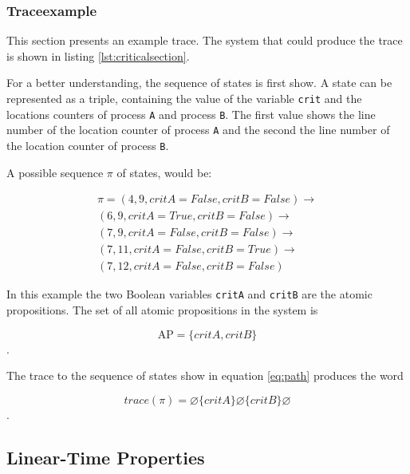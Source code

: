 \documentclass[12pt,a4paper,twoside]{article}
\begin{document}
\subsubsection{Traceexample}
\label{sec:traceexample}

This section presents an example trace. The system that could produce the trace is shown in listing \ref{lst:criticalsection}.



For a better understanding, the sequence of states is first show. A state can be represented as a triple, containing the value of the variable \verb|crit| and the locations counters of process \verb|A| and process \verb|B|. The first value shows the line number of the location counter of process \verb|A| and the second the line number of the location counter of process \verb|B|.

A possible sequence $\pi$ of states, would be:

\begin{equation}
  \label{eq:path}
  \begin{split}
\pi = (4, 9, {critA}={False},{critB}=False) \rightarrow \\
(6, 9, {critA}={True},{critB}=False) \rightarrow \\
(7, 9, {critA}={False},{critB}=False) \rightarrow \\
(7, 11, {critA}={False},{critB}=True) \rightarrow \\
(7, 12, {critA}={False},{critB}=False)
  \end{split}
\end{equation}

In this example the two Boolean variables \verb|critA| and \verb|critB| are the atomic propositions. The set of all atomic propositions in the system is

\[
\text{AP}=\{critA, critB\}
\].

The trace to the sequence of states show in equation \ref{eq:path} produces the word

\[
trace(\pi) = \varnothing \{critA\} \varnothing \{critB\} \varnothing
\].

\subsection{Linear-Time Properties}
\label{sec:satisfactionrelations}
\end{document}

